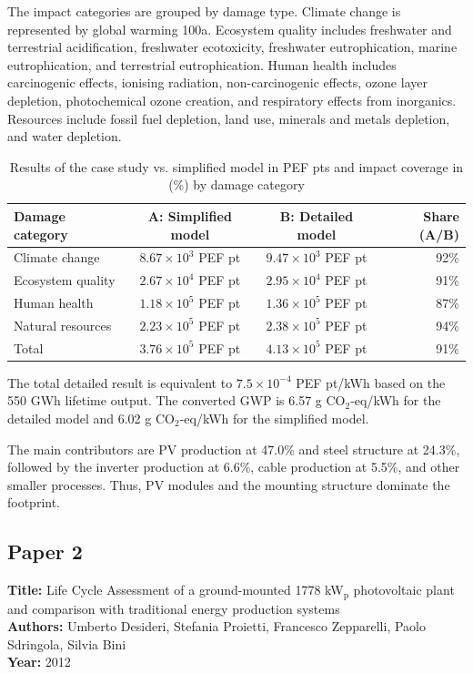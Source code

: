 \documentclass[9pt]{extarticle}
\begin{document}
The impact categories are grouped by damage type. Climate change is represented by
global warming 100a. Ecosystem quality includes freshwater and terrestrial
acidification, freshwater ecotoxicity, freshwater eutrophication, marine eutrophication,
and terrestrial eutrophication. Human health includes carcinogenic effects, ionising
radiation, non-carcinogenic effects, ozone layer depletion, photochemical ozone creation,
and respiratory effects from inorganics. Resources include fossil fuel depletion, land
use, minerals and metals depletion, and water depletion.

\begin{table}[H]
    \centering
    \renewcommand{\arraystretch}{1.25}
    \caption{Results of the case study vs. simplified model in PEF pts and impact coverage in (\%) by damage category}
    \begin{tabular}{l c c r}
        \textbf{Damage category} & \textbf{A: Simplified model} & \textbf{B: Detailed model} & \textbf{Share (A/B)} \\
        \hline
        Climate change & $8.67 \times 10^3$ PEF pt & $9.47 \times 10^3$ PEF pt & 92\% \\
        Ecosystem quality & $2.67 \times 10^4$ PEF pt & $2.95 \times 10^4$ PEF pt & 91\% \\
        Human health & $1.18 \times 10^5$ PEF pt & $1.36 \times 10^5$ PEF pt & 87\% \\
        Natural resources & $2.23 \times 10^5$ PEF pt & $2.38 \times 10^5$ PEF pt & 94\% \\
        \hline \hline
        Total & $3.76 \times 10^5$ PEF pt & $4.13 \times 10^5$ PEF pt & 91\%\\
    \end{tabular}
\end{table}
The total detailed result is equivalent to $7.5\times 10^{-4}$ PEF pt/kWh based on the
550 GWh lifetime output. The converted GWP is 6.57 g CO$_2$-eq/kWh for the detailed model
and 6.02 g CO$_2$-eq/kWh for the simplified model.

The main contributors are PV production at 47.0\% and steel structure at 24.3\%, followed
by the inverter production at 6.6\%, cable production at 5.5\%, and other smaller processes.
Thus, PV modules and the mounting structure dominate the footprint.

\subsection{Paper 2 \parencite{DESIDERI2012930}}
\textbf{Title:} Life Cycle Assessment of a ground-mounted 1778 kW$_\text{p}$ photovoltaic plant and comparison with traditional energy production systems\\
\textbf{Authors:} Umberto Desideri, Stefania Proietti, Francesco Zepparelli, Paolo Sdringola, Silvia Bini\\
\textbf{Year:} 2012
\end{document}
